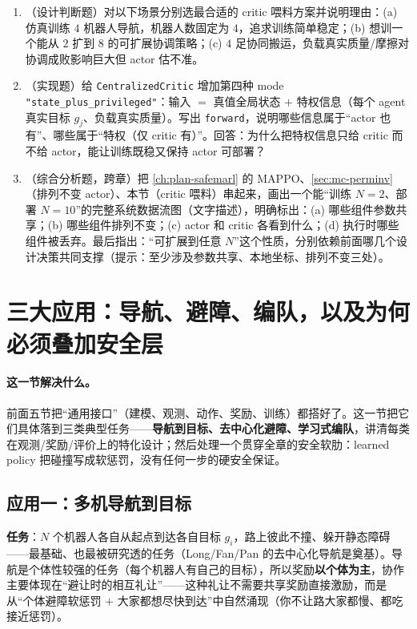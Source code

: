 \begin{practice}
\begin{enumerate}
  \item （设计判断题）对以下场景分别选最合适的 critic 喂料方案并说明理由：(a) 仿真训练 $4$ 机器人导航，机器人数固定为 $4$，追求训练简单稳定；(b) 想训一个能从 $2$ 扩到 $8$ 的可扩展协调策略；(c) $4$ 足协同搬运，负载真实质量/摩擦对协调成败影响巨大但 actor 估不准。
  \item （实现题）给 \verb|CentralizedCritic| 增加第四种 mode \verb|"state_plus_privileged"|：输入 $=$ 真值全局状态 $+$ 特权信息（每个 agent 真实目标 $g_j$、负载真实质量）。写出 \verb|forward|，说明哪些信息属于“actor 也有”、哪些属于“特权（仅 critic 有）”。回答：为什么把特权信息只给 critic 而不给 actor，能让训练既稳又保持 actor 可部署？
  \item （综合分析题，跨章）把 \cref{ch:plan-safemarl} 的 MAPPO、\cref{sec:mc-perminv}（排列不变 actor）、本节（critic 喂料）串起来，画出一个能“训练 $N{=}2$、部署 $N{=}10$”的完整系统数据流图（文字描述），明确标出：(a) 哪些组件参数共享；(b) 哪些组件排列不变；(c) actor 和 critic 各看到什么；(d) 执行时哪些组件被丢弃。最后指出：“可扩展到任意 $N$”这个性质，分别依赖前面哪几个设计决策共同支撑（提示：至少涉及参数共享、本地坐标、排列不变三处）。
\end{enumerate}
\end{practice}

\section{三大应用：导航、避障、编队，以及为何必须叠加安全层}
\label{sec:mc-apps}

\paragraph{这一节解决什么。}
前面五节把“通用接口”（建模、观测、动作、奖励、训练）都搭好了。这一节把它们具体落到三类典型任务——\textbf{导航到目标、去中心化避障、学习式编队}，讲清每类在观测/奖励/评价上的特化设计；然后处理一个贯穿全章的安全软肋：learned policy 把碰撞写成软惩罚，没有任何一步的硬安全保证。

\subsection{应用一：多机导航到目标}
\label{sec:mc-app-nav}
\textbf{任务}：$N$ 个机器人各自从起点到达各自目标 $g_i$，路上彼此不撞、躲开静态障碍——最基础、也最被研究透的任务（Long/Fan/Pan 的去中心化导航是奠基\cite{long2018collision}）。导航是个体性较强的任务（每个机器人有自己的目标），所以奖励\textbf{以个体为主}，协作主要体现在“避让时的相互礼让”——这种礼让不需要共享奖励直接激励，而是从“个体避障软惩罚 $+$ 大家都想尽快到达”中自然涌现（你不让路大家都慢、都吃接近惩罚）。

